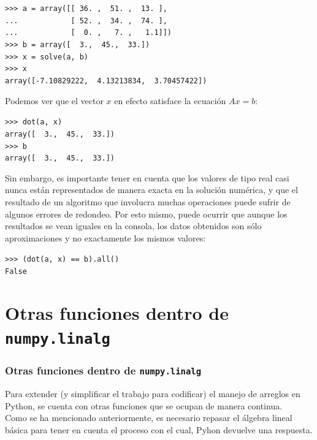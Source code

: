 \begin{frame}[fragile]
\fontsize{12}{12}\selectfont
\begin{exampleblock}{}
\verb|>>> a = array([[ 36. ,  51. ,  13. ],| \\
\verb|...            [ 52. ,  34. ,  74. ],| \\
\verb|...            [  0. ,   7. ,   1.1]])| \\
\pause
\verb|>>> b = array([  3.,  45.,  33.])| \\
\pause
\verb|>>> x = solve(a, b)| \\
\pause
\verb|>>> x| \\
\pause
\verb|array([-7.10829222,  4.13213834,  3.70457422])|
\end{exampleblock}
Podemos ver que el vector $x$ en efecto satisface la ecuaci\'{o}n $Ax = b$:
\begin{exampleblock}{}
\verb|>>> dot(a, x)| \\
\pause
\verb|array([  3.,  45.,  33.])| \\
\pause
\verb|>>> b| \\
\pause
\verb|array([  3.,  45.,  33.])|
\end{exampleblock}
\end{frame}
\begin{frame}[fragile]
Sin embargo, es importante tener en cuenta que los valores de tipo real casi nunca est\'{a}n representados de manera exacta en la soluci\'{o}n num\'{e}rica, y que el resultado de un algoritmo que involucra muchas operaciones puede sufrir de algunos errores de redondeo. Por esto mismo, puede ocurrir que aunque los resultados se vean iguales en la consola, los datos obtenidos son s\'{o}lo aproximaciones y no exactamente los mismos valores:
\begin{exampleblock}{}
\verb|>>> (dot(a, x) == b).all()| \\
\pause
\verb|False|
\end{exampleblock}
\end{frame}
\section{Otras funciones dentro de \texttt{numpy.linalg}}
\begin{frame}
\frametitle{Otras funciones dentro de \texttt{numpy.linalg}}
Para extender (y simplificar el trabajo para codificar) el manejo de arreglos en Python, se cuenta con otras funciones que se ocupan de manera continua.
\\
\bigskip
Como se ha mencionado anteriormente, es necesario repasar el \'{a}lgebra lineal b\'{a}sica para tener en cuenta el proceso con el cual, Pyhon devuelve una respuesta.
\end{frame}
